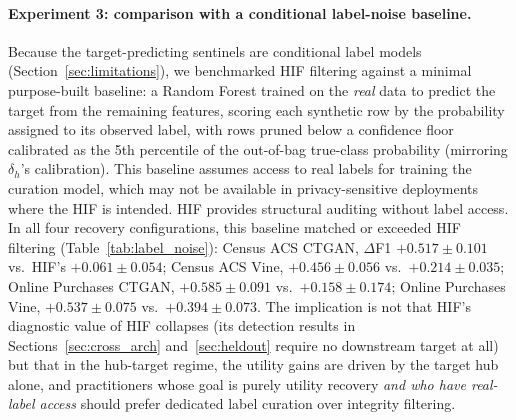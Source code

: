\documentclass[pdflatex,sn-mathphys-num]{sn-jnl}
\theoremstyle{thmstyleone}%
\theoremstyle{thmstyletwo}%
\theoremstyle{thmstylethree}%
\begin{document}
\paragraph{Experiment 3: comparison with a conditional label-noise baseline.} Because the target-predicting sentinels are conditional label models (Section~\ref{sec:limitations}), we benchmarked HIF filtering against a minimal purpose-built baseline: a Random Forest trained on the \emph{real} data to predict the target from the remaining features, scoring each synthetic row by the probability assigned to its observed label, with rows pruned below a confidence floor calibrated as the 5th percentile of the out-of-bag true-class probability (mirroring $\delta_h$'s calibration). This baseline assumes access to real labels for training the curation model, which may not be available in privacy-sensitive deployments where the HIF is intended. HIF provides structural auditing without label access. In all four recovery configurations, this baseline matched or exceeded HIF filtering (Table~\ref{tab:label_noise}): Census ACS CTGAN, $\Delta$F1 $+0.517 \pm 0.101$ vs.\ HIF's $+0.061 \pm 0.054$; Census ACS Vine, $+0.456 \pm 0.056$ vs.\ $+0.214 \pm 0.035$; Online Purchases CTGAN, $+0.585 \pm 0.091$ vs.\ $+0.158 \pm 0.174$; Online Purchases Vine, $+0.537 \pm 0.075$ vs.\ $+0.394 \pm 0.073$. The implication is not that HIF's diagnostic value of HIF collapses (its detection results in Sections~\ref{sec:cross_arch} and~\ref{sec:heldout} require no downstream target at all) but that in the hub-target regime, the utility gains are driven by the target hub alone, and practitioners whose goal is purely utility recovery \emph{and who have real-label access} should prefer dedicated label curation over integrity filtering.
\end{document}
